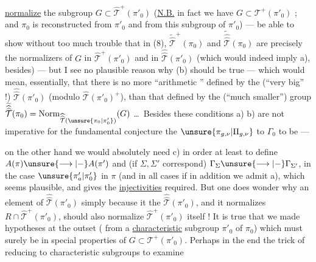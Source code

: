 \uline{normalize} the subgroup $G\subset\widehat{\mathcal T}^{+}(\pi'_0)$
(\uline{N.B.} in fact we have $G\subset\mathcal T^{+}(\pi'_0)$ ;  and $\pi_0$
is reconstructed from $\pi'_0$ and from
this subgroup of $\pi'_0$) --- 
be able to show without too much trouble
that  in (8), $\widetilde{\widehat{\mathcal T}}^{+}(\pi_0)$ and $\widetilde{\widehat{\widehat{\mathcal T}}}(\pi_0)$
are precisely the normalizers of $G$
in $\widehat{\mathcal T}^{+}(\pi'_0)$ and in $\widehat{\widehat{\mathcal T}}(\pi'_0)$ (which
would indeed imply a), besides) ---
but I see no plausible reason
why (b) should be true --- which would mean,
essentially, that there is no more
``arithmetic '' defined by the
(``very big'' !) $\widehat{\widehat{\mathcal T}}(\pi'_0)$ (modulo $\widehat{\mathcal T}(\pi'_0)^{+}$), than
that defined by the (``much smaller'') group
$\widetilde{\widehat{\widehat{\mathcal T}}}(\pi_0)=\operatorname{Norm}_{\widehat{\widehat{\mathcal T}}(\unsure{\pi_0|\pi'_0})}(G)$ \dots\ Besides these
conditions a) b) are not imperative
for the fundamental conjecture
 the $\unsure{\pi_{g,\nu}|\Pi_{g,\nu}}$ to $\Gamma_0$ to be  ---

on the other hand we would absolutely need
c) in order at least to define
$A(\pi)\unsure{\longrightarrow|{-}}A(\pi')$ and (if $\Sigma,\Sigma'$ correspond)
$\Gamma_{\Sigma}\unsure{\longrightarrow|{-}}\Gamma_{\Sigma'}$, in the case $\unsure{\pi'_a|\pi'_0}$  in $\pi$
(and in all cases if in addition we admit
a), which seems  plausible, and gives
the \uline{injectivities} required. But one
does wonder why an element
of  $\widehat{\widehat{\mathcal T}}(\pi'_0)$ simply because
it  the 
 $\widehat{\widehat{\mathcal T}}(\pi'_0)$,  and it normalizes
$R\cap\widehat{\mathcal T}^{+}(\pi'_0)$, should also normalize
$\widehat{\mathcal T}^{+}(\pi'_0)$ itself ! It is true that we
made  hypotheses at the outset
( from a \uline{characteristic} subgroup $\pi'_0$ of $\pi_0$) which
must surely be  in special
properties of $G\subset\mathcal T^{+}(\pi'_0)$. Perhaps
in the end the trick of reducing to
characteristic subgroups to examine

